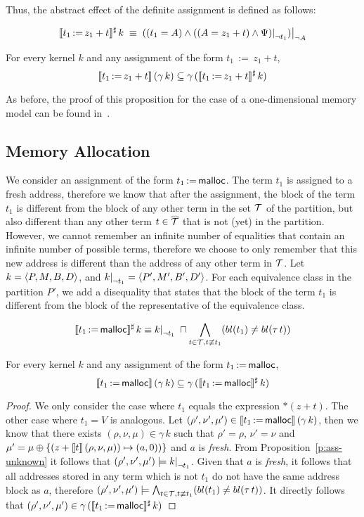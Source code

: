 Thus, the abstract effect of the definite assignment is defined as follows:

\[
	\sem{t_1\,{:=}\,z_1+t}^\sharp\,k\;\equiv\;
	\restr{((t_1=A)\land\restr{((A=z_1+t)\land\Psi)}{\neg t_1})}{\neg A}
\]

\begin{proposition}\label{p:ass-definite}
	For every kernel $k$ and any assignment of the form $t_1\,{:=}\,z_1+t$,
	\[
		\llbracket t_1\,{:=}\,z_1+t\rrbracket\,(\gamma\,k) \subseteq \gamma\,(\llbracket t_1\,{:=}\,z_1+t\rrbracket^\sharp\,k)
	\]
\end{proposition}

As before, the proof of this proposition for the case of a one-dimensional memory model can be found in~\cite{2pointer}.

\subsection{Memory Allocation}

We consider an assignment of the form $t_1\,{:=}\,\textsf{malloc}$.
The term $t_1$ is assigned to a fresh address, therefore we know that after the assignment,
the block of the term $t_1$ is different from the block of any other term in the set $\mathcal{T}$ of the partition,
but also different than any other term $t \in {\overline{\mathcal{T}}}$ that is not (yet) in the partition.
However, we cannot remember an infinite number of equalities that contain an infinite number of possible terms,
therefore we choose to only remember that this new address is different than the address of any other term in $\mathcal{T}$.
Let $k = \langle P, M, B,D\rangle$, and $\restr{k}{\neg t_1} = \angl{P', M', B', D'}$.
For each equivalence class in the partition $P'$, we add a disequality that states
that the block of the term $t_1$ is different from the block of the representative of the equivalence class.

\[
	\sem{t_1\,{:=}\,\text{\malloc}}^\sharp\,k \equiv
	\restr{k}{\neg t_1}\;\meet
	\bigwedge_{t\in \T, t \nequiv t_1}(bl(t_1) \neq bl(\tau\,t))
\]

\begin{proposition}\label{p:ass-malloc}
	For every kernel $k$ and any assignment of the form $t_1\,{:=}\,\textsf{malloc}$,
	\[
		\llbracket t_1\,{:=}\,\textsf{malloc}\rrbracket\,(\gamma\,k) \subseteq \gamma\,(\llbracket t_1\,{:=}\,\textsf{malloc}\rrbracket^\sharp\,k)
	\]
\end{proposition}

\begin{proof}
	We only consider the case where $t_1$ equals the expression $*(z+t)$.
	The other case where $t_1 = V$ is analogous.
	Let $(\rho',\nu',\mu') \in \llbracket t_1\,{:=}\,\textsf{malloc}\rrbracket\,(\gamma\,k)$, then we know that there exists $(\rho,\nu,\mu) \in \gamma\,k$ such that $\rho'=\rho$, $\nu'=\nu$ and $\mu' =\mu\oplus\{(z+\llbracket t\rrbracket\,(\rho,\nu,\mu))\mapsto (a,0))\}$ and $a$ is \emph{fresh}.
	From Proposition~\ref{p:ass-unknown} it follows that $(\rho',\nu',\mu') \models \restr{k}{\neg t_1}$.
	Given that $a$ is \emph{fresh}, it follows that all addresses stored in any term which is not $t_1$ do not have the same address block as $a$, therefore $(\rho',\nu',\mu') \models \bigwedge_{t\in \mathcal{T}, t \not\equiv t_1}(bl(t_1) \neq bl(\tau\,t))$.
	It directly follows that $(\rho',\nu',\mu') \in \gamma\,(\llbracket t_1\,{:=}\,\textsf{malloc}\rrbracket^\sharp\,k)$
\end{proof}
